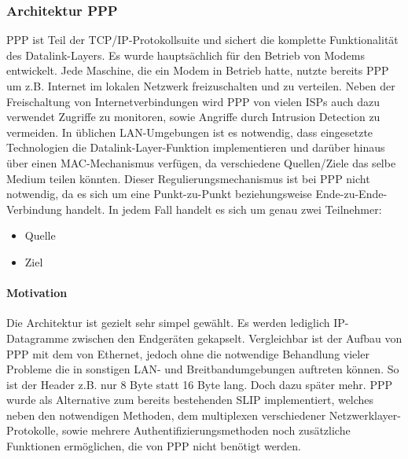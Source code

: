 \subsubsection[Architektur PPP (Schenkel)]{Architektur PPP}
\label{subsubsection:architecture_ppp}
\ac{PPP} ist Teil der TCP/IP-Protokollsuite und sichert die komplette Funktionalität des
Datalink-Layers. Es wurde hauptsächlich für den Betrieb von Modems entwickelt. %
Jede Maschine, die ein Modem in Betrieb hatte, nutzte bereits \ac{PPP} um z.B.
Internet im lokalen Netzwerk freizuschalten und zu verteilen.
Neben der Freischaltung von Internetverbindungen wird \ac{PPP} von vielen \acp{ISP}
auch dazu verwendet Zugriffe zu monitoren, sowie Angriffe durch Intrusion Detection zu vermeiden.
In üblichen \ac{LAN}-Umgebungen ist es notwendig, dass eingesetzte Technologien die Datalink-Layer-Funktion
implementieren und darüber hinaus über einen MAC-Mechanismus verfügen, da verschiedene
Quellen/Ziele das selbe Medium teilen könnten. Dieser Regulierungsmechanismus ist bei \ac{PPP}
nicht notwendig, da es sich um eine Punkt-zu-Punkt beziehungsweise Ende-zu-Ende-Verbindung handelt.
In jedem Fall handelt es sich um genau zwei Teilnehmer:
\begin{itemize}
	\item Quelle
	\item Ziel
\end{itemize}


\paragraph{Motivation} Die Architektur ist gezielt sehr simpel gewählt. Es werden lediglich IP-Datagramme zwischen den
Endgeräten gekapselt. Vergleichbar ist der Aufbau von PPP mit dem von Ethernet, jedoch ohne
die notwendige Behandlung vieler Probleme die in sonstigen \ac{LAN}- und Breitbandumgebungen
auftreten können. So ist der Header z.B. nur 8 Byte statt 16 Byte lang. Doch dazu später mehr.
\ac{PPP} wurde als Alternative zum bereits bestehenden \ac{SLIP} implementiert, welches neben den notwendigen
Methoden, dem multiplexen verschiedener Netzwerklayer-Protokolle, sowie mehrere Authentifizierungsmethoden noch zusätzliche Funktionen ermöglichen, die von PPP nicht benötigt werden.

